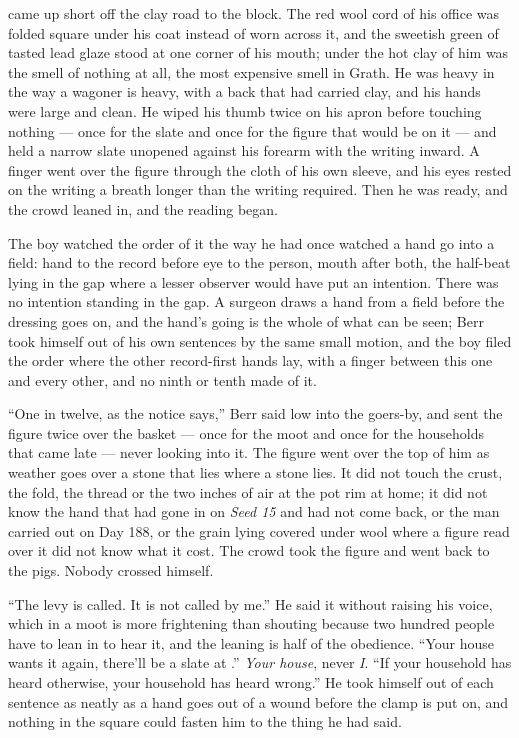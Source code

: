  came up short off the clay road to the block. The red wool cord of his office was folded square under his coat instead of worn across it, and the sweetish green of tasted lead glaze stood at one corner of his mouth; under the hot clay of him was the smell of nothing at all, the most expensive smell in Grath. He was heavy in the way a wagoner is heavy, with a back that had carried clay, and his hands were large and clean. He wiped his thumb twice on his apron before touching nothing --- once for the slate and once for the figure that would be on it --- and held a narrow slate unopened against his forearm with the writing inward. A finger went over the figure through the cloth of his own sleeve, and his eyes rested on the writing a breath longer than the writing required. Then he was ready, and the crowd leaned in, and the reading began.

The boy watched the order of it the way he had once watched a hand go into a field: hand to the record before eye to the person, mouth after both, the half-beat lying in the gap where a lesser observer would have put an intention. There was no intention standing in the gap. A surgeon draws a hand from a field before the dressing goes on, and the hand's going is the whole of what can be seen; Berr took himself out of his own sentences by the same small motion, and the boy filed the order where the other record-first hands lay, with a finger between this one and every other, and no ninth or tenth made of it.

“One in twelve, as the notice says,” Berr said low into the goers-by, and sent the figure twice over the basket --- once for the moot and once for the households that came late --- never looking into it. The figure went over the top of him as weather goes over a stone that lies where a stone lies. It did not touch the crust, the fold, the thread or the two inches of air at the pot rim at home; it did not know the hand that had gone in on \emph{Seed 15} and had not come back, or the man carried out on Day 188, or the grain lying covered under wool where a figure read over it did not know what it cost. The crowd took the figure and went back to the pigs. Nobody crossed himself.

“The levy is called. It is not called by me.” He said it without raising his voice, which in a moot is more frightening than shouting because two hundred people have to lean in to hear it, and the leaning is half of the obedience. “Your house wants it again, there'll be a slate at .” \emph{Your house}, never \emph{I}. “If your household has heard otherwise, your household has heard wrong.” He took himself out of each sentence as neatly as a hand goes out of a wound before the clamp is put on, and nothing in the square could fasten him to the thing he had said.

